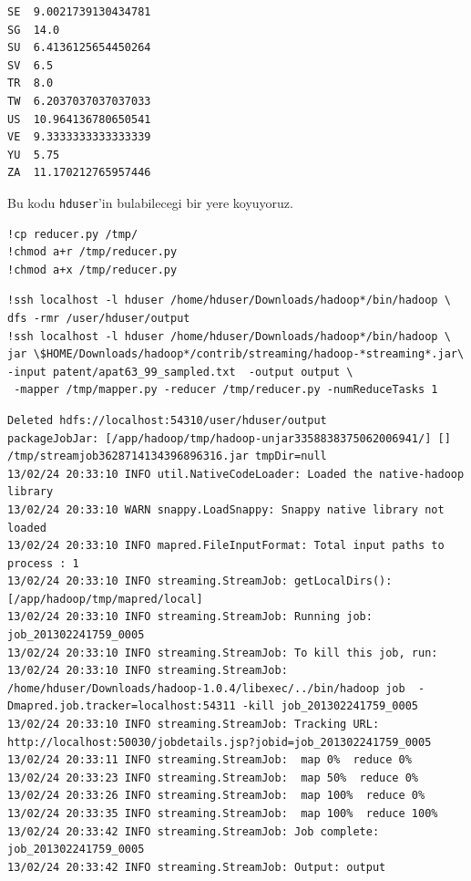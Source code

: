 \documentclass[12pt,fleqn]{article}\usepackage{../common}
\begin{document}
\begin{verbatim}
SE	9.0021739130434781
SG	14.0
SU	6.4136125654450264
SV	6.5
TR	8.0
TW	6.2037037037037033
US	10.964136780650541
VE	9.3333333333333339
YU	5.75
ZA	11.170212765957446
\end{verbatim}

Bu kodu \verb!hduser!'in bulabilecegi bir yere koyuyoruz. 

\begin{verbatim}
!cp reducer.py /tmp/
!chmod a+r /tmp/reducer.py
!chmod a+x /tmp/reducer.py
\end{verbatim}

\begin{verbatim}
!ssh localhost -l hduser /home/hduser/Downloads/hadoop*/bin/hadoop \
dfs -rmr /user/hduser/output
!ssh localhost -l hduser /home/hduser/Downloads/hadoop*/bin/hadoop \
jar \$HOME/Downloads/hadoop*/contrib/streaming/hadoop-*streaming*.jar\
-input patent/apat63_99_sampled.txt  -output output \
 -mapper /tmp/mapper.py -reducer /tmp/reducer.py -numReduceTasks 1 
\end{verbatim}

\begin{verbatim}
Deleted hdfs://localhost:54310/user/hduser/output
packageJobJar: [/app/hadoop/tmp/hadoop-unjar3358838375062006941/] [] /tmp/streamjob3628714134396896316.jar tmpDir=null
13/02/24 20:33:10 INFO util.NativeCodeLoader: Loaded the native-hadoop library
13/02/24 20:33:10 WARN snappy.LoadSnappy: Snappy native library not loaded
13/02/24 20:33:10 INFO mapred.FileInputFormat: Total input paths to process : 1
13/02/24 20:33:10 INFO streaming.StreamJob: getLocalDirs(): [/app/hadoop/tmp/mapred/local]
13/02/24 20:33:10 INFO streaming.StreamJob: Running job: job_201302241759_0005
13/02/24 20:33:10 INFO streaming.StreamJob: To kill this job, run:
13/02/24 20:33:10 INFO streaming.StreamJob: /home/hduser/Downloads/hadoop-1.0.4/libexec/../bin/hadoop job  -Dmapred.job.tracker=localhost:54311 -kill job_201302241759_0005
13/02/24 20:33:10 INFO streaming.StreamJob: Tracking URL: http://localhost:50030/jobdetails.jsp?jobid=job_201302241759_0005
13/02/24 20:33:11 INFO streaming.StreamJob:  map 0%  reduce 0%
13/02/24 20:33:23 INFO streaming.StreamJob:  map 50%  reduce 0%
13/02/24 20:33:26 INFO streaming.StreamJob:  map 100%  reduce 0%
13/02/24 20:33:35 INFO streaming.StreamJob:  map 100%  reduce 100%
13/02/24 20:33:42 INFO streaming.StreamJob: Job complete: job_201302241759_0005
13/02/24 20:33:42 INFO streaming.StreamJob: Output: output
\end{verbatim}
\end{document}
